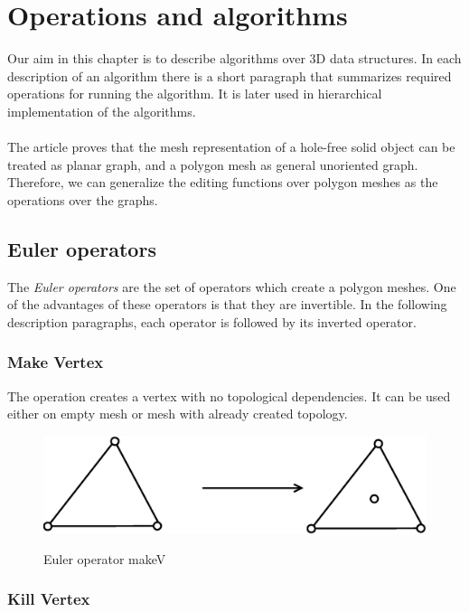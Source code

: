 \chapter{Operations and algorithms}

\label{chap:op_al}

Our aim in this chapter is to describe algorithms over 3D data structures. In each description of
an algorithm there is a short paragraph that summarizes required operations for running the algorithm.
It is later used in hierarchical implementation of the algorithms.\\
\\
The article\cite{Grunbaum2007} proves that the mesh representation of a hole-free solid object can be
treated as planar graph, and a polygon mesh as general unoriented graph. Therefore, we can generalize the
editing functions over polygon meshes as the operations over the graphs.\\

\section{Euler operators}
\label{sec:euler}

The \emph{Euler operators} are the set of operators which create a polygon meshes. One of the advantages
of these operators is that they are invertible. In the following description paragraphs,
each operator is followed by its inverted operator.

\subsection{Make Vertex}

The operation creates a vertex with no topological dependencies. It can be used
either on empty mesh or mesh with already created topology.

\begin{figure}[h]
\centering
\includegraphics[scale=0.25]{../img/makeV.eps}
\label{fig:makev}
\caption{Euler operator makeV}
\end{figure}

\subsection{Kill Vertex}

